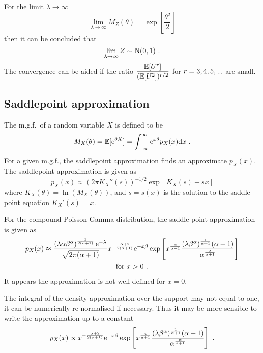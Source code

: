 For the limit $\lambda\rightarrow\infty$
\begin{equation}
	\lim_{\lambda\rightarrow\infty}M_Z(\theta) = \exp\left[\frac{\theta^2}{2}\right]
\end{equation}
then it can be concluded that
\begin{equation}
	\lim_{\lambda\rightarrow\infty}Z\sim\operatorname{N}(0,1)
	\ .
\end{equation}
The convergence can be aided if the ratio $\dfrac{\operatorname{\mathbb{E}}[U^r]}{(\operatorname{\mathbb{E}}[U^2])^{r/2}}$ for $r=3,4,5,\dotdotdot$ are small.

\subsection{Saddlepoint approximation}
The m.g.f.~of a random variable $X$ is defined to be
\begin{equation}
	M_X(\theta)=\operatorname{\mathbb{E}}[\mathrm{e}^{\theta X}]
	=
	\int_{-\infty}^{\infty}\mathrm{e}^{x\theta} p_X(x) \mathrm{d} x
	\ .
\end{equation}
For a given m.g.f., the saddlepoint approximation \citep{daniels1954saddlepoint} \citep{butler2007saddlepoint} finds an approximate $p_X(x)$. The saddlepoint approximation is given as
\begin{equation}
	p_X(x)\approx\left(2\pi K_X''(s)\right)^{-1/2}\exp\left[K_X(s)-sx\right]
	\label{eq:saddlePoint:generalSaddlePoint}
\end{equation}
where $K_X(\theta) = \ln\left(M_X(\theta)\right)$, and $s=s(x)$ is the solution to the saddle point equation $K_X'(s)=x$.

For the compound Poisson-Gamma distribution, the saddle point approximation is given as 
\begin{multline}
	p_X(x)\approx
	\frac{\left(\lambda\alpha\beta^\alpha\right)^{\frac{1}{2(\alpha+1)}}\mathrm{e}^{-\lambda}}{\sqrt{2\pi(\alpha+1)}}x^{-\frac{\alpha+2}{2(\alpha+1)}}
	\mathrm{e}^{-x\beta}
	\exp\left[x^{\frac{\alpha}{\alpha+1}}
		\frac{(\lambda\beta^\alpha)^{\frac{1}{\alpha+1}}(\alpha+1)}{\alpha^{\frac{\alpha}{\alpha+1}}}
	\right]
	\\
	\text{for }x>0 \ .
	\label{eq:saddle_point_approx}
\end{multline}
It appears the approximation is not well defined for $x=0$.

The integral of the density approximation over the support may not equal to one, it can be numerically re-normalised if necessary. Thus it may be more sensible to write the approximation up to a constant
\begin{equation}
	p_X(x)\propto x^{-\frac{\alpha+2}{2(\alpha+1)}}\mathrm{e}^{-x\beta}
	\exp\left[
		x^{\frac{\alpha}{\alpha+1}}
		\frac{
			(\lambda\beta^\alpha)^{\frac{1}{\alpha+1}}(\alpha+1)
		}
		{
			\alpha^{\frac{\alpha}{\alpha+1}}
		}
	\right]
	\ .
\end{equation}

